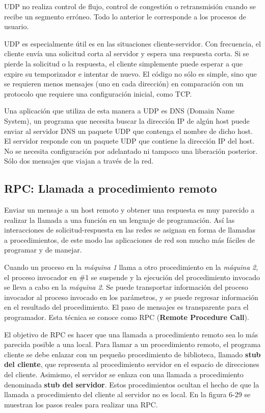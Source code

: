 \documentclass[10pt,a4paper]{report}
\begin{document}
	\par UDP no realiza control de flujo, control de congestión o retransmisión cuando se recibe un segmento erróneo. Todo lo anterior le corresponde a los procesos de usuario. 
	
	\par UDP es especialmente útil es en las situaciones cliente-servidor. Con frecuencia, el cliente envía una solicitud corta al servidor y espera una respuesta corta. Si se pierde la solicitud o la respuesta, el cliente simplemente puede esperar a que expire su temporizador e intentar de nuevo. El código no sólo es simple, sino que se requieren menos mensajes (uno en cada dirección) en comparación con un protocolo que requiere una configuración inicial, como TCP.

	\par Una aplicación que utiliza de esta manera a UDP es DNS (Domain Name System), un programa que necesita buscar la dirección IP de algún host puede enviar al servidor DNS un paquete UDP que contenga el nombre de dicho host. El servidor responde con un paquete UDP que contiene la dirección IP del host. No se necesita configuración por adelantado ni tampoco una liberación posterior. Sólo dos mensajes que viajan a través de la red.
	
\subsection{RPC: Llamada a procedimiento remoto}

	\par Enviar un mensaje a un host remoto y obtener una respuesta es muy parecido a realizar la llamada a una función en un lenguaje de programación. Así las interacciones de solicitud-respuesta en las redes se asignan en forma de llamadas a procedimientos, de este modo las aplicaciones de red son mucho más fáciles de programar y de manejar.
	
	\par Cuando un proceso en la \textit{máquina 1} llama a otro procedimiento en la \textit{máquina 2}, el proceso invocador en \#1 se suspende y la ejecución del procedimiento invocado se lleva a cabo en la \textit{máquina 2}. Se puede transportar información del proceso invocador al proceso invocado en los parámetros, y se puede regresar información en el resultado del procedimiento. El paso de mensajes es transparente para el programador. Esta técnica se conoce como RPC (\textbf{Remote Procedure Call}).

	\par El objetivo de RPC es hacer que una llamada a procedimiento remoto sea lo más parecida posible a una local. Para llamar a un procedimiento remoto, el programa cliente se debe enlazar con un pequeño procedimiento de biblioteca, llamado \textbf{stub del cliente}, que representa al procedimiento servidor en el espacio de direcciones del cliente. Asimismo, el servidor se enlaza con una llamada a procedimiento denominada \textbf{stub del servidor}. Estos procedimientos ocultan el hecho de que la llamada a procedimiento del cliente al servidor no es local. En la figura 6-29 se muestran los pasos reales para realizar una RPC.
	
\end{document}
